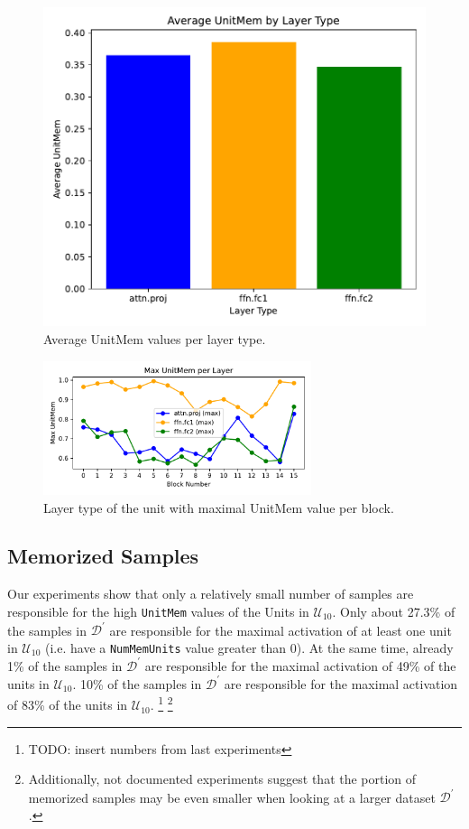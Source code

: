 \documentclass{article} %
\begin{document}
\begin{figure}[ht]
\begin{minipage}{0.48\textwidth}
      \includegraphics[width=\textwidth]{figures/mem_avg_per_layer_type.pdf}
      \caption{Average UnitMem values per layer type.}
      \label{fig:mem_avg_per_layer_type}
   \end{minipage}
\end{figure}

\begin{figure}[ht]
   \centering
   \includegraphics[width=0.7\textwidth]{figures/mem_max_per_layer_num.pdf}
   \caption{Layer type of the unit with maximal UnitMem value per block.}
   \label{fig:mem_max_per_layer_num}
\end{figure}

\subsection{Memorized Samples}
Our experiments show that only a relatively small number of samples are responsible for the high \texttt{UnitMem} values of the Units in $\mathcal{U}_{10}$.
Only about 27.3\% of the samples in $\mathcal{D}^\prime$ are responsible for the maximal activation of at least one unit in $\mathcal{U}_{10}$ (i.e. have a \texttt{NumMemUnits} value greater than 0).
At the same time, already 1\% of the samples in $\mathcal{D}^\prime$ are responsible for the maximal activation of 49\% of the units in $\mathcal{U}_{10}$.
10\% of the samples in $\mathcal{D}^\prime$ are responsible for the maximal activation of 83\% of the units in $\mathcal{U}_{10}$.
\footnote{TODO: insert numbers from last experiments}
\footnote{Additionally, not documented experiments suggest that the portion of memorized samples may be even smaller when looking at a larger dataset $\mathcal{D}^\prime$.}
\end{document}

